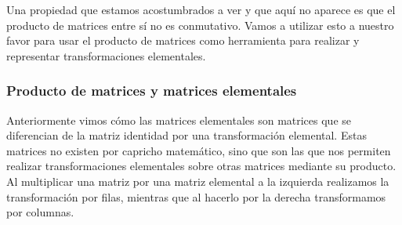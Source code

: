 Una propiedad que estamos acostumbrados a ver y que aquí no aparece es que el producto de matrices entre sí no es conmutativo.
Vamos a utilizar esto a nuestro favor para usar el producto de matrices como herramienta para realizar y representar transformaciones elementales.

\subsubsection{Producto de matrices y matrices elementales}

Anteriormente vimos cómo las matrices elementales son matrices que se diferencian de la matriz identidad por una transformación elemental.
Estas matrices no existen por capricho matemático, sino que son las que nos permiten realizar transformaciones elementales sobre otras matrices mediante su producto.
Al multiplicar una matriz por una matriz elemental a la izquierda realizamos la transformación por filas, mientras que al hacerlo por la derecha transformamos por columnas.

